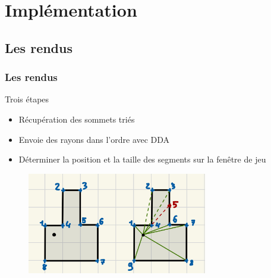 \documentclass{beamer}
\begin{document}
\section{Implémentation}

\subsection{Les rendus}

\begin{frame}
    \frametitle{Les rendus}
    \begin{block}{Trois étapes}
        \begin{itemize}
            \item Récupération des sommets triés 
            \item Envoie des rayons dans l'ordre avec DDA
            \item Déterminer la position et la taille des segments sur la fenêtre de jeu
        \end{itemize}
    \end{block}
    \begin{figure}
        \centering
        \includegraphics[width=0.7\textwidth]{images/envoie-rayon-ordre.jpg}
    \end{figure}
\end{frame}
\end{document}
